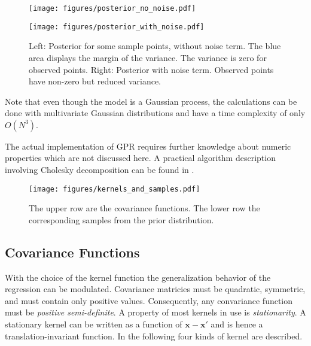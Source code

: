 \documentclass[english]{article}
\newcommand{\x}{\mathbf{x}}
\begin{document}
\begin{figure}

  \begin{minipage}{0.5\textwidth}
  \texttt{[image: figures/posterior\_no\_noise.pdf]}
  \end{minipage}%
  \begin{minipage}{0.5\textwidth}
  \texttt{[image: figures/posterior\_with\_noise.pdf]}
  \end{minipage}%

  \caption{Left: Posterior for some sample points, without noise term. The blue area displays the margin of the variance. The variance is zero for observed points. Right: Posterior with noise term. Observed points have non-zero but reduced variance.}
  \label{gpr}
\end{figure}


Note that even though the model is a Gaussian process, the calculations can be done with multivariate Gaussian distributions and have a time complexity of only $O(N^3)$.

The actual implementation of GPR requires further knowledge about numeric properties which are not discussed here. A practical algorithm description involving Cholesky decomposition can be found in \cite[Algorithm 2.1]{rasmussen_gaussian_2006}.


\begin{figure}
  \texttt{[image: figures/kernels\_and\_samples.pdf]}
  \caption{The upper row are the covariance functions. The lower row the corresponding samples from the prior distribution.}
  \label{kernels}
\end{figure}

\subsection{Covariance Functions}
With the choice of the kernel function the generalization behavior of the regression can be modulated. Covariance matricies must be quadratic, symmetric, and must contain only positive values. Consequently, any convariance function must be \textit{positive semi-definite}. A property of most kernels in use is \textit{stationarity}. A stationary kernel can be written as a function of $\x-\x'$ and is hence a translation-invariant function. In the following four kinds of kernel are described.
\end{document}
